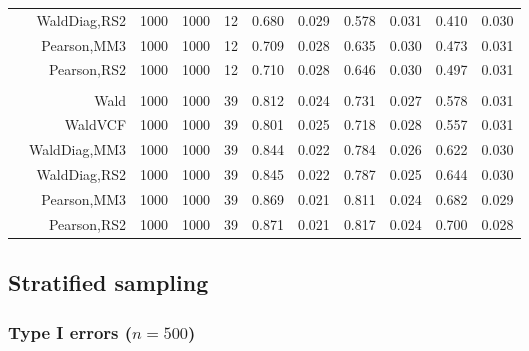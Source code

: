 \documentclass[
]{article}
\begin{document}
\begin{table}[H]
{\begin{tabular}[t]{lrrrrrrrlrr}
\hspace{1em} & WaldDiag,RS2 & 1000 & 1000 & 12 & 0.680 & 0.029 & 0.578 & 0.031 & 0.410 & 0.030\\

\hspace{1em} & Pearson,MM3 & 1000 & 1000 & 12 & 0.709 & 0.028 & 0.635 & 0.030 & 0.473 & 0.031\\

\hspace{1em} & Pearson,RS2 & 1000 & 1000 & 12 & 0.710 & 0.028 & 0.646 & 0.030 & 0.497 & 0.031\\
\cmidrule{1-11}
\addlinespace[0.3em]
\multicolumn{11}{l}{\textbf{3F 15V}}\\
\hspace{1em} & Wald & 1000 & 1000 & 39 & 0.812 & 0.024 & 0.731 & 0.027 & 0.578 & 0.031\\

\hspace{1em} & WaldVCF & 1000 & 1000 & 39 & 0.801 & 0.025 & 0.718 & 0.028 & 0.557 & 0.031\\

\hspace{1em} & WaldDiag,MM3 & 1000 & 1000 & 39 & 0.844 & 0.022 & 0.784 & 0.026 & 0.622 & 0.030\\

\hspace{1em} & WaldDiag,RS2 & 1000 & 1000 & 39 & 0.845 & 0.022 & 0.787 & 0.025 & 0.644 & 0.030\\

\hspace{1em} & Pearson,MM3 & 1000 & 1000 & 39 & 0.869 & 0.021 & 0.811 & 0.024 & 0.682 & 0.029\\

\hspace{1em} & Pearson,RS2 & 1000 & 1000 & 39 & 0.871 & 0.021 & 0.817 & 0.024 & 0.700 & 0.028\\
\bottomrule
\end{tabular}}
\endgroup{}
\end{table}

\hypertarget{stratified-sampling}{%
\subsection{Stratified sampling}\label{stratified-sampling}}

\hypertarget{type-i-errors-n500-1}{%
\subsubsection{\texorpdfstring{Type I errors
(\(n=500\))}{Type I errors (n=500)}}\label{type-i-errors-n500-1}}
\end{document}
